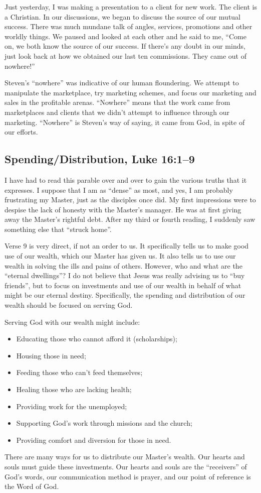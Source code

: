 \documentclass[12pt]{memoir}
\begin{document}
Just yesterday, I was making a presentation to a client for new work.
The client is a Christian. In our discussions, we began to discuss
the source of our mutual success. There was much mundane talk of angles,
services, promotions and other worldly things. We paused and looked
at each other and he said to me, ``Come on, we both know the source
of our success. If there's any doubt in our minds, just look back
at how we obtained our last ten commissions. They came out of nowhere!'' 

Steven's ``nowhere'' was indicative of our human floundering. We
attempt to manipulate the marketplace, try marketing schemes, and
focus our marketing and sales in the profitable arenas. ``Nowhere''
means that the work came from marketplaces and clients that we didn't
attempt to influence through our marketing. ``Nowhere'' is Steven's
way of saying, it came from God, in spite of our efforts.

\subsection{Spending\slash{}Distribution, Luke 16:1--9}

I have had to read this parable over and over to gain the various
truths that it expresses. I suppose that I am as ``dense'' as most,
and yes, I am probably frustrating my Master, just as the disciples
once did. My first impressions were to despise the lack of honesty
with the Master's manager. He was at first giving away the Master's
rightful debt. After my third or fourth reading, I suddenly saw something
else that ``struck home''.

Verse 9 is very direct, if not an order to us. It specifically tells
us to make good use of our wealth, which our Master has given us.
It also tells us to use our wealth in solving the ills and pains of
others. However, who and what are the ``eternal dwellings''? I do
not believe that Jesus was really advising us to ``buy friends'',
but to focus on investments and use of our wealth in behalf of what
might be our eternal destiny. Specifically, the spending and distribution
of our wealth should be focused on serving God. 

Serving God with our wealth might include: 
\begin{itemize}
\item Educating those who cannot afford it (scholarships); 
\item Housing those in need; 
\item Feeding those who can't feed themselves; 
\item Healing those who are lacking health; 
\item Providing work for the unemployed; 
\item Supporting God's work through missions and the church; 
\item Providing comfort and diversion for those in need. 
\end{itemize}
There are many ways for us to distribute our Master's wealth. Our
hearts and souls must guide these investments. Our hearts and souls
are the ``receivers'' of God's words, our communication method is
prayer, and our point of reference is the Word of God.
\end{document}
